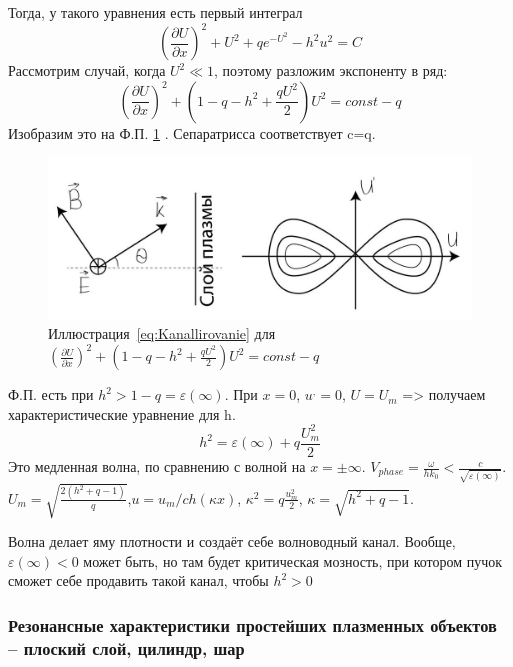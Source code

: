 \documentclass[10pt, a4paper]{article}
\begin{document}
Тогда, у такого уравнения есть первый интеграл
\begin{equation}
	(\frac{\partial U}{\partial x})^2 + U^2 +q e^{-U^2} - h^2u^2=C
\end{equation}
Рассмотрим случай, когда $U^2 \ll 1$, поэтому разложим экспоненту в ряд:
\begin{equation}
	(\frac{\partial U}{\partial x})^2 + (1-q-h^2+\frac{qU^2}{2})U^2=const - q
	\label{eq:Kanallirovanie}
\end{equation}
Изобразим это на Ф.П. \ref{fig:Kanallirovanie} . Сепаратрисса соответствует c=q.
\begin{figure}
	\begin{center}
		\includegraphics[width=0.5\linewidth]{Kanallirovanie.JPG}
	\end{center}
\caption{Иллюстрация~\eqref{eq:Kanallirovanie} для $(\frac{\partial U}{\partial x})^2 + (1-q-h^2+\frac{qU^2}{2})U^2=const - q$}		
\label{fig:Kanallirovanie}
\end{figure}

Ф.П. есть при $h^2> 1-q=\varepsilon(\infty)$. При $x=0$, $u^{,}=0$, $U=U_m$ => получаем характеристические уравнение для h.
\begin{equation}
	h^2=\varepsilon(\infty)+q \frac{U^2_m}{2}
\end{equation}
Это медленная волна, по сравнению с волной на $x= \pm \infty$. $V_{phase}=\frac{\omega}{h k_0}< \frac{c}{\sqrt{\varepsilon(\infty)}}$. $U_m=\sqrt{\frac{2(h^2+q-1)}{q}}$,$u=u_m / ch(\kappa x)$, $\kappa^2=q \frac{u_m^2}{2}$, $\kappa=\sqrt{h^2+q-1}$.

Волна делает яму плотности и создаёт себе волноводный канал. Вообще, $\varepsilon(\infty)<0$ может быть, но там будет критическая мозность, при котором пучок сможет себе продавить такой канал, чтобы $h^2>0$

\subsubsection{Резонансные характеристики простейших плазменных объектов – плоский слой, цилиндр, шар}
\end{document}
